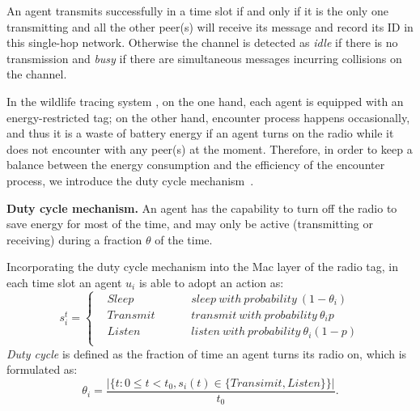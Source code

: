 An agent transmits successfully in a time slot if and only if 
it is the only one transmitting and all the other peer(s) will
receive its message and record its ID in this single-hop network. Otherwise the channel is detected
as \emph{idle} if there is no transmission and \emph{busy} if there 
are simultaneous messages incurring collisions on the channel.

In the wildlife tracing system {\sysname}, 
on the one hand,
each agent is equipped with an energy-restricted tag;
on the other hand, encounter process happens occasionally, and thus
it is a waste of battery energy if an agent turns on the radio while it does 
not encounter with any peer(s) at the moment. 
Therefore, in order to keep a balance between the energy consumption 
and the efficiency of the encounter process, we introduce the duty cycle mechanism~\cite{Zhang2017Performance}.

\textbf{Duty cycle mechanism.} 
An agent has the capability to turn off the radio to save
energy for most of the time, and may only be active 
(transmitting or receiving) during a fraction $\theta$ of the time.

Incorporating the duty cycle mechanism into the Mac layer of the radio tag, 
in each time slot an agent $u_i$ is able to adopt an action as:
$$ s_i^t=\left\{
\begin{aligned}
&Sleep  & & & &{sleep~ with~ probability~ (1-\theta_i)}  	 \\
&Transmit  & & & &{transmit~ with~ probability~ \theta_i p}	\\
&Listen  & & & &{listen~ with~ probability~\theta_i(1-p)}	\\
\end{aligned}
\right.
$$
\emph{Duty cycle} is defined as the fraction of time an agent turns its radio on, 
which is formulated as:
$$\theta_i=\frac{|\{t: 0\leq t<t_0, s_i(t) \in \{Transimit,Listen\}\}|}{t_0}.
$$



